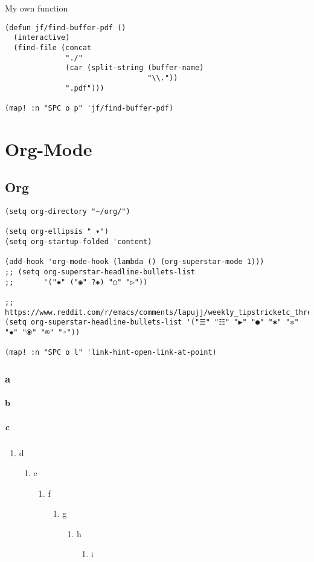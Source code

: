\documentclass[8pt]{article}
\begin{document}
My own function
\begin{verbatim}
(defun jf/find-buffer-pdf ()
  (interactive)
  (find-file (concat
              "./"
              (car (split-string (buffer-name)
                                 "\\."))
              ".pdf")))

(map! :n "SPC o p" 'jf/find-buffer-pdf)
\end{verbatim}

\section{Org-Mode}
\label{sec:orga77104f}
\subsection{Org}
\label{sec:org791de05}
\begin{verbatim}
(setq org-directory "~/org/")

(setq org-ellipsis " ▾")
(setq org-startup-folded 'content)

(add-hook 'org-mode-hook (lambda () (org-superstar-mode 1)))
;; (setq org-superstar-headline-bullets-list
;;       '("✸" ("◉" ?◈) "○" "▷"))

;; https://www.reddit.com/r/emacs/comments/lapujj/weekly_tipstricketc_thread/glvoifj/
(setq org-superstar-headline-bullets-list '("☰" "☷" "▶" "●" "✱" "✲" "✸" "⦿" "⌾" "◦"))

(map! :n "SPC o l" 'link-hint-open-link-at-point)
\end{verbatim}
\subsubsection{a}
\label{sec:org6108bad}
\paragraph{b}
\label{sec:org109f49b}
\subparagraph{c}
\label{sec:org5dc51e4}
\begin{enumerate}
\item d
\label{sec:org6b0011e}
\begin{enumerate}
\item e
\label{sec:orge147889}
\begin{enumerate}
\item f
\label{sec:org9517c87}
\begin{enumerate}
\item g
\label{sec:org1bf97df}
\begin{enumerate}
\item h
\label{sec:org8a65771}
\begin{enumerate}
\item i
\label{sec:orga730813}
\end{enumerate}
\end{enumerate}
\end{enumerate}
\end{enumerate}
\end{enumerate}
\end{enumerate}
\end{document}
